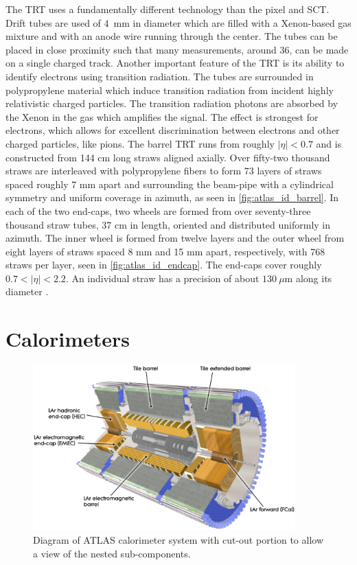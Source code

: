 The TRT uses a fundamentally different technology 
than the pixel and SCT.
Drift tubes are used of 4~mm in diameter 
which are filled with a Xenon-based gas mixture
and with an anode wire running through the center.
The tubes can be placed in close
proximity such that many measurements, around 36,
can be made on a single charged track. Another important feature
of the TRT is its ability to identify electrons using transition radiation.
The tubes are surrounded in polypropylene material which  induce
transition radiation from incident highly relativistic charged particles.
The transition radiation photons are absorbed by the Xenon in the gas
which amplifies the signal. The effect is strongest for electrons, 
which allows for excellent discrimination between electrons
and other charged particles, like pions.
The barrel TRT runs from roughly $|\eta|<0.7$ and
is constructed from 144 cm long straws aligned
axially. Over fifty-two thousand straws are interleaved
with polypropylene fibers to form 73 layers of straws 
spaced roughly 7 mm apart and surrounding the beam-pipe with
a cylindrical symmetry and uniform coverage in azimuth,
as seen in \fig\ref{fig:atlas_id_barrel}.
In each of the two end-caps, two wheels are formed from over seventy-three
thousand straw tubes, 37 cm in length, 
oriented and distributed uniformly in azimuth. 
The inner wheel is formed from twelve layers and the outer wheel from eight
layers of straws spaced 8 mm and 15 mm apart, respectively,  
with 768 straws per layer, seen in \fig\ref{fig:atlas_id_endcap}.
The end-caps cover roughly $0.7<|\eta|<2.2$.
An individual straw has a precision of about $130~\mu\textrm{m}$ along
its diameter \cite{ATLAS-CONF-2014-047}.




\section{Calorimeters }
\begin{figure}[ht!]
\centering
\includegraphics[width=0.9\textwidth]{figures/atlas/calorimeter.eps}
\caption{Diagram of ATLAS calorimeter system with cut-out portion
to allow a view of the nested sub-components.}
\label{fig:atlas_calorimeter}
\end{figure}


